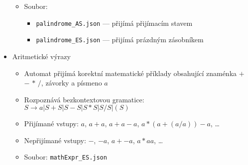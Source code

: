 \begin{itemize}
\begin{itemize}
            \item Soubor: 
            \begin{itemize}
                \item \texttt{palindrome\_AS.json} --- přijímá přijímacím stavem
                \item \texttt{palindrome\_ES.json} --- přijímá prázdným zásobníkem
            \end{itemize}
        \end{itemize}
    \item Aritmetické výrazy
        \begin{itemize}
            \item Automat přijímá korektní matematické příklady obsahující znaménka $+$ $-$ $*$ $/$, závorky a písmeno $a$
            \item Rozpoznává bezkontextovou gramatice: $S \rightarrow a | S + S | S - S | S * S | S / S | ( S )$
            \item Přijímané vstupy: $a$, $a+a$, $a+a-a$, $a*(a+(a/a))-a$, \ldots
            \item Nepřijímané vstupy: $-$, $-a$, $a+-a$, $a*aa$, \ldots
            \item Soubor: \texttt{mathExpr\_ES.json}
        \end{itemize}
\end{itemize}

\endinput